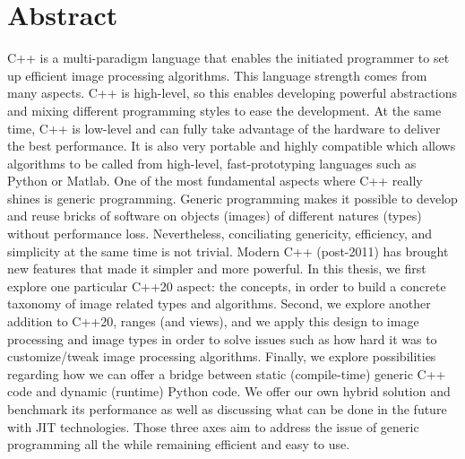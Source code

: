 \section*{Abstract}
\label{sec:abstract}
C++ is a multi-paradigm language that enables the initiated programmer to set up efficient image processing algorithms.
This language strength comes from many aspects. C++ is high-level, so this enables developing powerful abstractions and
mixing different programming styles to ease the development. At the same time, C++ is low-level and can fully take
advantage of the hardware to deliver the best performance. It is also very portable and highly compatible which allows
algorithms to be called from high-level, fast-prototyping languages such as Python or Matlab. One of the most
fundamental aspects where C++ really shines is generic programming. Generic programming makes it possible to develop and
reuse bricks of software on objects (images) of different natures (types) without performance loss. Nevertheless,
conciliating genericity, efficiency, and simplicity at the same time is not trivial. Modern C++ (post-2011) has brought
new features that made it simpler and more powerful. In this thesis, we first explore one particular C++20 aspect: the
concepts, in order to build a concrete taxonomy of image related types and algorithms. Second, we explore another
addition to C++20, ranges (and views), and we apply this design to image processing and image types in order to solve
issues such as how hard it was to customize/tweak image processing algorithms. Finally, we explore possibilities
regarding how we can offer a bridge between static (compile-time) generic C++ code and dynamic (runtime) Python code. We
offer our own hybrid solution and benchmark its performance as well as discussing what can be done in the future with
JIT technologies. Those three axes aim to address the issue of generic programming all the while remaining efficient and
easy to use.

\bigskip

\bigskip

